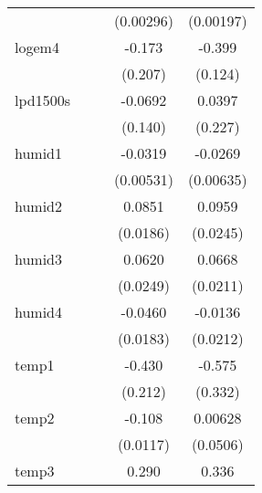 {\begin{tabular}{l*{4}{c}}
            &                     &                     &   (0.00296)         &   (0.00197)         \\
[1em]
logem4      &                     &                     &      -0.173         &      -0.399\sym{**} \\
            &                     &                     &     (0.207)         &     (0.124)         \\
[1em]
lpd1500s    &                     &                     &     -0.0692         &      0.0397         \\
            &                     &                     &     (0.140)         &     (0.227)         \\
[1em]
humid1      &                     &                     &     -0.0319\sym{***}&     -0.0269\sym{**} \\
            &                     &                     &   (0.00531)         &   (0.00635)         \\
[1em]
humid2      &                     &                     &      0.0851\sym{**} &      0.0959\sym{**} \\
            &                     &                     &    (0.0186)         &    (0.0245)         \\
[1em]
humid3      &                     &                     &      0.0620\sym{*}  &      0.0668\sym{**} \\
            &                     &                     &    (0.0249)         &    (0.0211)         \\
[1em]
humid4      &                     &                     &     -0.0460\sym{*}  &     -0.0136         \\
            &                     &                     &    (0.0183)         &    (0.0212)         \\
[1em]
temp1       &                     &                     &      -0.430         &      -0.575         \\
            &                     &                     &     (0.212)         &     (0.332)         \\
[1em]
temp2       &                     &                     &      -0.108\sym{***}&     0.00628         \\
            &                     &                     &    (0.0117)         &    (0.0506)         \\
[1em]
temp3       &                     &                     &       0.290\sym{**} &       0.336\sym{**} \\

\end{tabular}}

